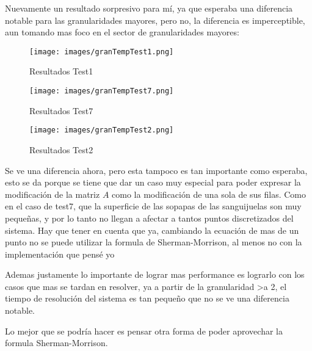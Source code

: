 \documentclass[a4paper]{article}
\begin{document}
Nuevamente un resultado sorpresivo para mí, ya que esperaba una diferencia notable para las granularidades mayores, pero no, la diferencia es imperceptible, aun tomando mas foco en el sector de granularidades mayores:

\begin{minipage}[t]{0.45\linewidth}
  \begin{figure}[H]
  \centering
  \texttt{[image: images/granTempTest1.png]}
  \caption{Resultados Test1}
  \label{exp1plot}
  \end{figure}
\end{minipage}%
\hfill
\begin{minipage}[t]{0.45\linewidth}
 \centering
     \begin{figure}[H]
    \centering
    \texttt{[image: images/granTempTest7.png]}
    \caption{Resultados Test7}
    \label{exp1plot}
    \end{figure}
\end{minipage}
\begin{center}
\begin{minipage}[t]{0.45\linewidth}
\begin{figure}[H]
\centering
\texttt{[image: images/granTempTest2.png]}
\caption{Resultados Test2}
\label{exp1plot}
\end{figure}
\end{minipage}%
\end{center}

Se ve una diferencia ahora, pero esta tampoco es tan importante como esperaba, esto se da porque se tiene que dar un caso muy especial para poder expresar la modificación de la matriz $A$ como la modificación de una sola de sus filas. Como en el caso de test7, que la superficie de las sopapas de las sanguijuelas son muy pequeñas, y por lo tanto no llegan a afectar a tantos puntos discretizados del sistema. Hay que tener en cuenta que ya, cambiando la ecuación de mas de un punto no se puede utilizar la formula de Sherman-Morrison, al menos no con la implementación que pensé yo

Ademas justamente lo importante de lograr mas performance es lograrlo con los casos que mas se tardan en resolver, ya a partir de la granularidad \textgreater a 2, el tiempo de resolución del sistema es tan pequeño que no se ve una diferencia notable.

Lo mejor que se podría hacer es pensar otra forma de poder aprovechar la formula Sherman-Morrison.
\end{document}
